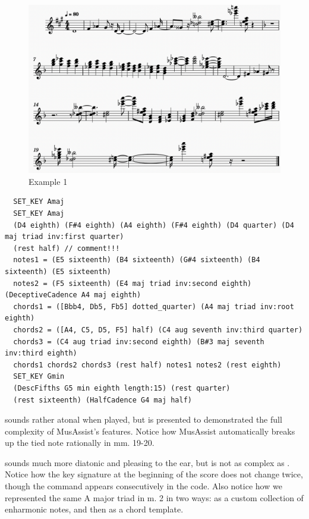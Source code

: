 \documentclass{article}
\begin{document}
\begin{figure}[h!]
\centering
\includegraphics[width=\textwidth]{images/program1}
\caption{Example 1}
\label{fig:ex1}
\end{figure}

\newpage

\begin{verbatim}
  SET_KEY Amaj
  SET_KEY Amaj
  (D4 eighth) (F#4 eighth) (A4 eighth) (F#4 eighth) (D4 quarter) (D4 maj triad inv:first quarter) 
  (rest half) // comment!!!
  notes1 = (E5 sixteenth) (B4 sixteenth) (G#4 sixteenth) (B4 sixteenth) (E5 sixteenth) 
  notes2 = (F5 sixteenth) (E4 maj triad inv:second eighth) (DeceptiveCadence A4 maj eighth) 
  chords1 = ([Bbb4, Db5, Fb5] dotted_quarter) (A4 maj triad inv:root eighth) 
  chords2 = ([A4, C5, D5, F5] half) (C4 aug seventh inv:third quarter) 
  chords3 = (C4 aug triad inv:second eighth) (B#3 maj seventh inv:third eighth)
  chords1 chords2 chords3 (rest half) notes1 notes2 (rest eighth)
  SET_KEY Gmin
  (DescFifths G5 min eighth length:15) (rest quarter)
  (rest sixteenth) (HalfCadence G4 maj half)
  \end{verbatim}
  
 sounds rather atonal when played, but is presented to demonstrated the full complexity of MusAssist's features. Notice how MusAssist automatically breaks up the tied note rationally in mm. 19-20.

 sounds much more diatonic and pleasing to the ear, but is not as complex as . Notice how the key signature at the beginning of the score does not change twice, though the command appears consecutively in the code. Also notice how  we represented the same A major triad in m. 2 in two ways: as a custom collection of enharmonic notes, and then as a chord template.
\end{document}
